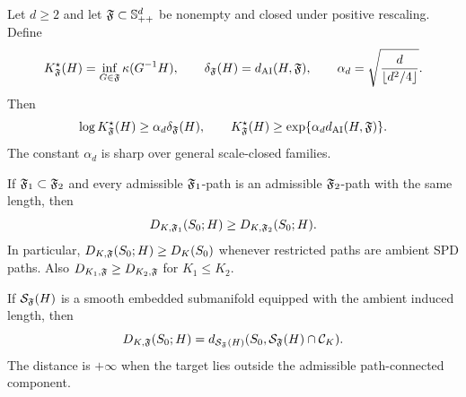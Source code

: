 \begin{corollary}
\label{thm:scale-closed-threshold}
Let \(d\ge2\) and let \(\mathfrak F\subset\mathbb S_{++}^d\) be nonempty and closed under
positive rescaling.  Define
\[
  K_\mathfrak F^\star(H)=\inf_{G\in\mathfrak F}\kappa(G^{-1}H),
  \qquad
  \delta_\mathfrak F(H)=d_{\mathrm{AI}}(H,\mathfrak F),
  \qquad
  \alpha_d=\sqrt{\frac{d}{\lfloor d^2/4\rfloor}}.
\]
Then
\[
  \log K_\mathfrak F^\star(H)\ge\alpha_d\delta_\mathfrak F(H),
  \qquad
  K_\mathfrak F^\star(H)\ge\exp\{\alpha_d d_{\mathrm{AI}}(H,\mathfrak F)\}.
\]
The constant \(\alpha_d\) is sharp over general scale-closed families.
\end{corollary}

\begin{proposition}
\label{prop:monotonicity}
If \(\mathfrak F_1\subset\mathfrak F_2\) and every admissible \(\mathfrak F_1\)-path is an admissible
\(\mathfrak F_2\)-path with the same length, then
\[
  D_{K,\mathfrak F_1}(S_0;H)\ge D_{K,\mathfrak F_2}(S_0;H).
\]
In particular, \(D_{K,\mathfrak F}(S_0;H)\ge D_K(S_0)\) whenever restricted paths are
ambient SPD paths.  Also
\(D_{K_1,\mathfrak F}\ge D_{K_2,\mathfrak F}\) for \(K_1\le K_2\).
\end{proposition}

\begin{proposition}
\label{prop:submanifold-distance}
If \(\mathcal S_\mathfrak F(H)\) is a smooth embedded submanifold equipped with the
ambient induced length, then
\[
  D_{K,\mathfrak F}(S_0;H)
  =
  d_{\mathcal S_\mathfrak F(H)}
  (S_0,\mathcal S_\mathfrak F(H)\cap\mathcal C_K).
\]
The distance is \(+\infty\) when the target lies outside the admissible
path-connected component.
\end{proposition}
